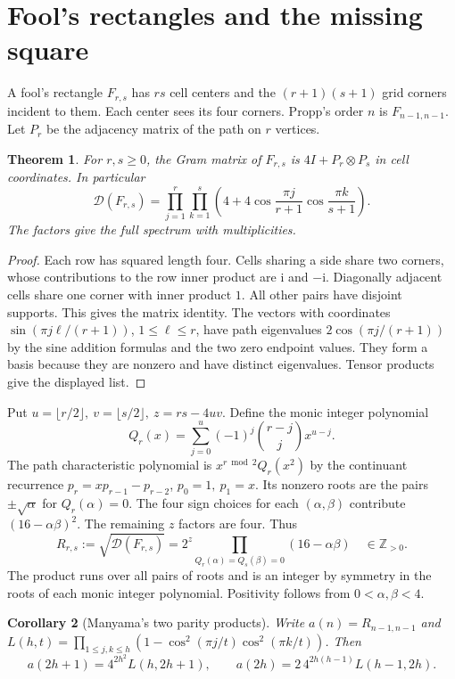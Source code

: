 \documentclass[11pt,letterpaper]{article}
\newtheorem{theorem}{Theorem}[section]
\newtheorem{corollary}[theorem]{Corollary}
\newcommand{\ii}{\mathrm i}
\newcommand{\Z}{\mathbb Z}
\newcommand{\Gram}{\mathcal D}
\begin{document}
\section{Fool's rectangles and the missing square}
A fool's rectangle \(F_{r,s}\) has \(rs\) cell centers and the \((r+1)(s+1)\) grid corners incident to them. Each center sees its four corners. Propp's order \(n\) is \(F_{n-1,n-1}\). Let \(P_r\) be the adjacency matrix of the path on \(r\) vertices.
\begin{theorem}\label{th:fool}
For \(r,s\ge0\), the Gram matrix of \(F_{r,s}\) is \(4I+P_r\otimes P_s\) in cell coordinates. In particular
\[
 \Gram(F_{r,s})=\prod_{j=1}^{r}\prod_{k=1}^{s}
 \left(4+4\cos\frac{\pi j}{r+1}\cos\frac{\pi k}{s+1}\right).
\]
The factors give the full spectrum with multiplicities.
\end{theorem}
\begin{proof}
Each row has squared length four. Cells sharing a side share two corners, whose contributions to the row inner product are \(\ii\) and \(-\ii\). Diagonally adjacent cells share one corner with inner product \(1\). All other pairs have disjoint supports. This gives the matrix identity. The vectors with coordinates \(\sin(\pi j\ell/(r+1))\), \(1\le\ell\le r\), have path eigenvalues \(2\cos(\pi j/(r+1))\) by the sine addition formulas and the two zero endpoint values. They form a basis because they are nonzero and have distinct eigenvalues. Tensor products give the displayed list.
\end{proof}
Put \(u=\lfloor r/2\rfloor,\ v=\lfloor s/2\rfloor,\ z=rs-4uv\). Define the monic integer polynomial
\[
 Q_r(x)=\sum_{j=0}^{u}(-1)^j\binom{r-j}{j}x^{u-j}.
\]
The path characteristic polynomial is \(x^{r\bmod2}Q_r(x^2)\) by the continuant recurrence \(p_r=xp_{r-1}-p_{r-2}\), \(p_0=1,\ p_1=x\). Its nonzero roots are the pairs \(\pm\sqrt{\alpha}\) for \(Q_r(\alpha)=0\). The four sign choices for each \((\alpha,\beta)\) contribute \((16-\alpha\beta)^2\). The remaining \(z\) factors are four. Thus
\begin{equation}\label{eq:resultant}
 R_{r,s}:=\sqrt{\Gram(F_{r,s})}
 =2^z\!\!\prod_{Q_r(\alpha)=Q_s(\beta)=0}(16-\alpha\beta)\quad\in\Z_{>0}.
\end{equation}
The product runs over all pairs of roots and is an integer by symmetry in the roots of each monic integer polynomial. Positivity follows from \(0<\alpha,\beta<4\).
\begin{corollary}[Manyama's two parity products]\label{th:manyama}
Write \(a(n)=R_{n-1,n-1}\) and \(L(h,t)=\prod_{1\le j,k\le h}
(1-\cos^2(\pi j/t)\cos^2(\pi k/t))\). Then
\[
 a(2h+1)=4^{2h^2}L(h,2h+1),\qquad
 a(2h)=2\,4^{2h(h-1)}L(h-1,2h).
\]
\end{corollary}
\end{document}
